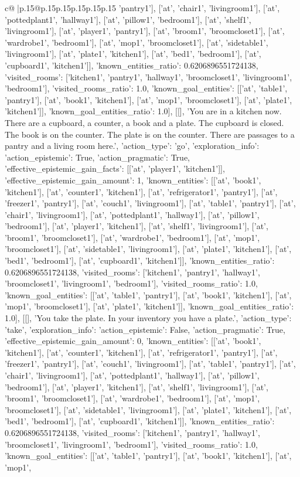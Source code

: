 \documentclass{article}
\begin{document}
{\begin{supertabular}{c@{$\;$}|p{.15\linewidth}@{}p{.15\linewidth}p{.15\linewidth}p{.15\linewidth}p{.15\linewidth}p{.15\linewidth}}
{{{'pantry1'], ['at', 'chair1', 'livingroom1'], ['at', 'pottedplant1', 'hallway1'], ['at', 'pillow1', 'bedroom1'], ['at', 'shelf1', 'livingroom1'], ['at', 'player1', 'pantry1'], ['at', 'broom1', 'broomcloset1'], ['at', 'wardrobe1', 'bedroom1'], ['at', 'mop1', 'broomcloset1'], ['at', 'sidetable1', 'livingroom1'], ['at', 'plate1', 'kitchen1'], ['at', 'bed1', 'bedroom1'], ['at', 'cupboard1', 'kitchen1']], 'known_entities_ratio': 0.6206896551724138, 'visited_rooms': ['kitchen1', 'pantry1', 'hallway1', 'broomcloset1', 'livingroom1', 'bedroom1'], 'visited_rooms_ratio': 1.0, 'known_goal_entities': [['at', 'table1', 'pantry1'], ['at', 'book1', 'kitchen1'], ['at', 'mop1', 'broomcloset1'], ['at', 'plate1', 'kitchen1']], 'known_goal_entities_ratio': 1.0}}], [[], 'You are in a kitchen now. There are a cupboard, a counter, a book and a plate. The cupboard is closed. The book is on the counter. The plate is on the counter. There are passages to a pantry and a living room here.', {'action_type': 'go', 'exploration_info': {'action_epistemic': True, 'action_pragmatic': True, 'effective_epistemic_gain_facts': [['at', 'player1', 'kitchen1']], 'effective_epistemic_gain_amount': 1, 'known_entities': [['at', 'book1', 'kitchen1'], ['at', 'counter1', 'kitchen1'], ['at', 'refrigerator1', 'pantry1'], ['at', 'freezer1', 'pantry1'], ['at', 'couch1', 'livingroom1'], ['at', 'table1', 'pantry1'], ['at', 'chair1', 'livingroom1'], ['at', 'pottedplant1', 'hallway1'], ['at', 'pillow1', 'bedroom1'], ['at', 'player1', 'kitchen1'], ['at', 'shelf1', 'livingroom1'], ['at', 'broom1', 'broomcloset1'], ['at', 'wardrobe1', 'bedroom1'], ['at', 'mop1', 'broomcloset1'], ['at', 'sidetable1', 'livingroom1'], ['at', 'plate1', 'kitchen1'], ['at', 'bed1', 'bedroom1'], ['at', 'cupboard1', 'kitchen1']], 'known_entities_ratio': 0.6206896551724138, 'visited_rooms': ['kitchen1', 'pantry1', 'hallway1', 'broomcloset1', 'livingroom1', 'bedroom1'], 'visited_rooms_ratio': 1.0, 'known_goal_entities': [['at', 'table1', 'pantry1'], ['at', 'book1', 'kitchen1'], ['at', 'mop1', 'broomcloset1'], ['at', 'plate1', 'kitchen1']], 'known_goal_entities_ratio': 1.0}}], [[], 'You take the plate. In your inventory you have a plate.', {'action_type': 'take', 'exploration_info': {'action_epistemic': False, 'action_pragmatic': True, 'effective_epistemic_gain_amount': 0, 'known_entities': [['at', 'book1', 'kitchen1'], ['at', 'counter1', 'kitchen1'], ['at', 'refrigerator1', 'pantry1'], ['at', 'freezer1', 'pantry1'], ['at', 'couch1', 'livingroom1'], ['at', 'table1', 'pantry1'], ['at', 'chair1', 'livingroom1'], ['at', 'pottedplant1', 'hallway1'], ['at', 'pillow1', 'bedroom1'], ['at', 'player1', 'kitchen1'], ['at', 'shelf1', 'livingroom1'], ['at', 'broom1', 'broomcloset1'], ['at', 'wardrobe1', 'bedroom1'], ['at', 'mop1', 'broomcloset1'], ['at', 'sidetable1', 'livingroom1'], ['at', 'plate1', 'kitchen1'], ['at', 'bed1', 'bedroom1'], ['at', 'cupboard1', 'kitchen1']], 'known_entities_ratio': 0.6206896551724138, 'visited_rooms': ['kitchen1', 'pantry1', 'hallway1', 'broomcloset1', 'livingroom1', 'bedroom1'], 'visited_rooms_ratio': 1.0, 'known_goal_entities': [['at', 'table1', 'pantry1'], ['at', 'book1', 'kitchen1'], ['at', 'mop1', }}}
\end{supertabular}}
\end{document}
